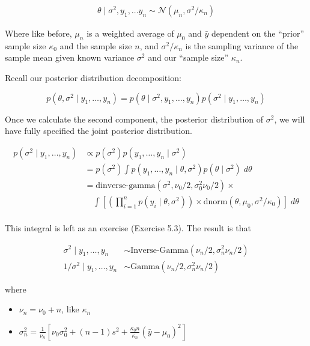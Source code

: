 \documentclass[]{article}
\providecommand{\tightlist}{%
  \setlength{\itemsep}{0pt}\setlength{\parskip}{0pt}}
\begin{document}
\begin{align}
\theta \mid \sigma^2, y_1, \dots y_n \sim \mathcal{N}(\mu_n, \sigma^2 / \kappa_n)
\end{align}

Where like before, \(\mu_n\) is a weighted average of \(\mu_0\) and
\(\bar{y}\) dependent on the ``prior'' sample size \(\kappa_0\) and the
sample size \(n\), and \(\sigma^2 / \kappa_n\) is the sampling variance
of the sample mean given known variance \(\sigma^2\) and our ``sample
size'' \(\kappa_n\).

Recall our posterior distribution decomposition:

\[
p(\theta, \sigma^2 \mid y_1, \dots, y_n) =  p(\theta \mid \sigma^2, y_1, \dots, y_n) p(\sigma^2 \mid y_1, \dots, y_n)
\]

Once we calculate the second component, the posterior distribution of
\(\sigma^2\), we will have fully specified the joint posterior
distribution.

\begin{align}
p(\sigma^2 \mid y_1, \dots, y_n) &\propto p(\sigma^2) p(y_1, \dots, y_n \mid \sigma^2) \\
&= p(\sigma^2) \int p(y_1, \dots, y_n \mid \theta, \sigma^2) p(\theta \mid \sigma^2) \; d\theta \\
&= \text{dinverse-gamma}(\sigma^2, \nu_0 / 2, \sigma_0^2 \nu_0 / 2) \times \\ &\quad \int \left[ \left( \prod_{i = 1}^{n} p(y_i \mid \theta, \sigma^2) \right) \times \text{dnorm}(\theta, \mu_0, \sigma^2 / \kappa_0)  \right] \; d\theta \\
\end{align}

This integral is left as an exercise (Exercise 5.3). The result is that

\begin{align}
\sigma^2 \mid y_1, \dots, y_n & \sim \text{Inverse-Gamma}(\nu_n / 2, \sigma_n^2 \nu_n / 2) \\
1 / \sigma^2 \mid y_1, \dots, y_n &\sim \text{Gamma}(\nu_n / 2, \sigma_n^2 \nu_n / 2)
\end{align}

where

\begin{itemize}
\tightlist
\item
  \(\nu_n = \nu_0 + n\), like \(\kappa_n\)
\item
  \(\sigma_n^2 = \frac{1}{\nu_n} \left[ \nu_0 \sigma_0^2 + (n - 1)s^2 + \frac{\kappa_0 n}{\kappa_n} (\bar{y} - \mu_0)^2 \right]\)
\end{itemize}
\end{document}
